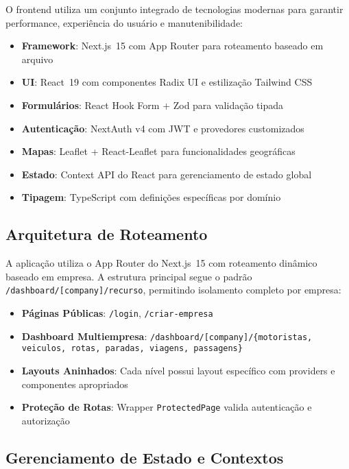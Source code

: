 O frontend utiliza um conjunto integrado de tecnologias modernas para garantir performance, experiência do usuário e manutenibilidade:

\begin{itemize}
  \item \textbf{Framework}: Next.js~15 com App Router para roteamento baseado em arquivo
  \item \textbf{UI}: React~19 com componentes Radix UI e estilização Tailwind CSS
  \item \textbf{Formulários}: React Hook Form + Zod para validação tipada
  \item \textbf{Autenticação}: NextAuth v4 com JWT e provedores customizados
  \item \textbf{Mapas}: Leaflet + React-Leaflet para funcionalidades geográficas
  \item \textbf{Estado}: Context API do React para gerenciamento de estado global
  \item \textbf{Tipagem}: TypeScript com definições específicas por domínio
\end{itemize}

\subsection{Arquitetura de Roteamento}

A aplicação utiliza o App Router do Next.js~15 com roteamento dinâmico baseado em empresa. A estrutura principal segue o padrão \texttt{/dashboard/[company]/recurso}, permitindo isolamento completo por empresa:

\begin{itemize}
  \item \textbf{Páginas Públicas}: \texttt{/login}, \texttt{/criar-empresa}
  \item \textbf{Dashboard Multiempresa}: \texttt{/dashboard/[company]/\{motoristas, veiculos, rotas, paradas, viagens, passagens\}}
  \item \textbf{Layouts Aninhados}: Cada nível possui layout específico com providers e componentes apropriados
  \item \textbf{Proteção de Rotas}: Wrapper \texttt{ProtectedPage} valida autenticação e autorização
\end{itemize}

\subsection{Gerenciamento de Estado e Contextos}

